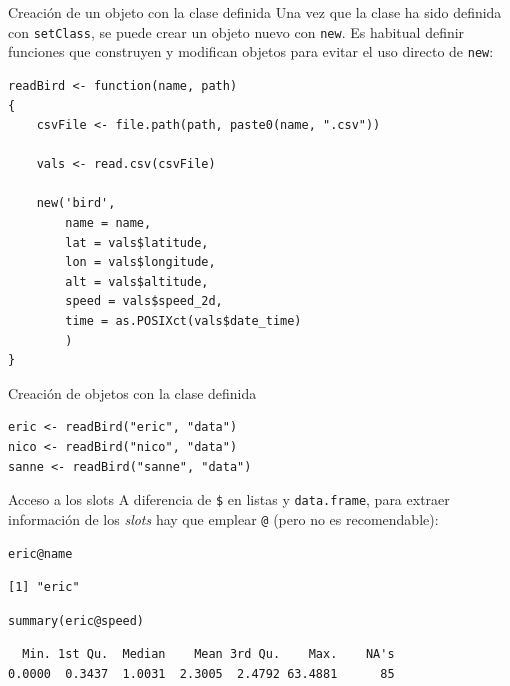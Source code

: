 \documentclass[xcolor={usenames,svgnames,dvipsnames}]{beamer}
\begin{document}
\begin{frame}[label={sec:org0ccfea5},fragile]{Creación de un objeto con la clase definida}
 Una vez que la clase ha sido definida con \texttt{setClass}, se puede crear un objeto nuevo con \texttt{new}. Es habitual definir funciones que construyen y modifican objetos para evitar el uso directo de \texttt{new}:
\lstset{language=r,label= ,caption= ,captionpos=b,numbers=none}
\begin{lstlisting}
readBird <- function(name, path)
{
    csvFile <- file.path(path, paste0(name, ".csv"))

    vals <- read.csv(csvFile)
    
    new('bird',
        name = name,
        lat = vals$latitude,
        lon = vals$longitude,
        alt = vals$altitude,
        speed = vals$speed_2d,
        time = as.POSIXct(vals$date_time)
        )
}  
\end{lstlisting}
\end{frame}

\begin{frame}[label={sec:org09fa9e3},fragile]{Creación de objetos con la clase definida}
 \lstset{language=r,label= ,caption= ,captionpos=b,numbers=none}
\begin{lstlisting}
eric <- readBird("eric", "data")
nico <- readBird("nico", "data")
sanne <- readBird("sanne", "data")
\end{lstlisting}
\end{frame}


\begin{frame}[label={sec:orgefc647d},fragile]{Acceso a los slots}
 A diferencia de \texttt{\$} en listas y \texttt{data.frame}, para extraer información de los \emph{slots} hay que emplear \texttt{@} (pero no es recomendable):
\lstset{language=r,label= ,caption= ,captionpos=b,numbers=none}
\begin{lstlisting}
eric@name
\end{lstlisting}

\begin{verbatim}
[1] "eric"
\end{verbatim}


\lstset{language=r,label= ,caption= ,captionpos=b,numbers=none}
\begin{lstlisting}
summary(eric@speed)
\end{lstlisting}

\begin{verbatim}
  Min. 1st Qu.  Median    Mean 3rd Qu.    Max.    NA's 
0.0000  0.3437  1.0031  2.3005  2.4792 63.4881      85
\end{verbatim}
\end{frame}
\end{document}
